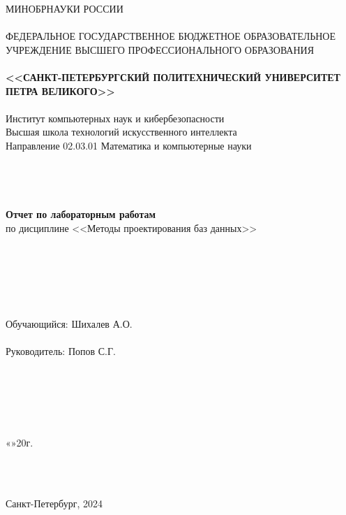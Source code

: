 \documentclass[11pt,a4paper,final]{article} %
\begin{document}
\thispagestyle{empty}

\begin{center}
	{\Large МИНОБРНАУКИ РОССИИ}\\
	~\\
	{\large ФЕДЕРАЛЬНОЕ ГОСУДАРСТВЕННОЕ БЮДЖЕТНОЕ ОБРАЗОВАТЕЛЬНОЕ УЧРЕЖДЕНИЕ ВЫСШЕГО ПРОФЕССИОНАЛЬНОГО ОБРАЗОВАНИЯ}\\
	~\\
	{\Large \bf <<САНКТ-ПЕТЕРБУРГСКИЙ ПОЛИТЕХНИЧЕСКИЙ УНИВЕРСИТЕТ ПЕТРА ВЕЛИКОГО>>}\\
	~\\
	{\large Институт компьютерных наук и кибербезопасности }\\
	{\large Высшая школа технологий искусственного интеллекта}\\
	{\large Направление 02.03.01 Математика и компьютерные науки}\\
	~\\
	~\\
	~\\
	~\\
	{\Large \bf  Отчет по лабораторным работам }\\
	\vspace{3mm}
	{\Large {по дисциплине <<Методы проектирования баз данных>>}}\\
	\vspace{3mm}
	~\\
	~\\
	~\\
	~\\
	~\\
	~\\
	{\large Обучающийся: \underline{\hspace{3.5cm}} \hspace{12mm} Шихалев А.О.}\\
	~\\
	{\large Руководитель: \underline{\hspace{3.5cm}} \hspace{12mm} Попов С.Г.}\\
	~\\
	~\\
	~\\
	~\\
	~\\
\end{center}
\begin{flushright}
	
	«\underline{\hspace{1cm}}»\underline{\hspace{3cm}}20\underline{\hspace{0.7cm}}г.
\end{flushright}
~\\
~\\
\begin{center}
	{\large Санкт-Петербург, 2024}
\end{center}
\end{document}

